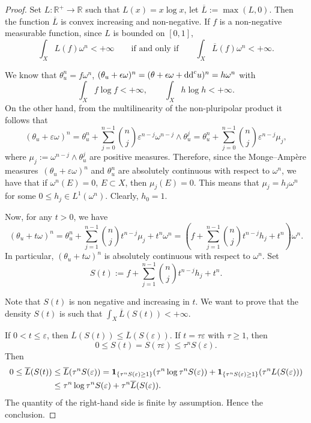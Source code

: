 \documentclass[pdftex]{sigma}
\numberwithin{equation}{section}
\theoremstyle{plain}
\newcommand{\R}{\mathbb R}
\begin{document}
\begin{proof}
Set $L\colon \R^+\rightarrow \R$ such that $L(x)= x \log x$, let $\overline{L}:=\max(L,0)$. Then the function $\overline{L}$ is convex increasing and non-negative. If $f$ is a non-negative measurable function, since $L$ is bounded on $[0,1]$,
\[\int_X L(f) \omega^n < +\infty \qquad \text{if and only if}\qquad \int_X \overline{L}(f) \omega^n < +\infty. \]

We know that $\theta_u^n = f \omega^n$, $(\theta_u+\epsilon\omega)^n=(\theta+\epsilon\omega +{\rm dd}^c u)^n = h \omega^n$ with
\[\int_X f \log f< +\infty, \qquad \int_X h\log h< +\infty.\]
On the other hand, from the multilinearity of the non-pluripolar product it follows that
\[(\theta_u+\varepsilon\omega)^n =\theta_u^n + \sum_{j=0}^{n-1} \binom{n}{j} \varepsilon^{n-j} \omega^{n-j} \wedge \theta_u^j=\theta_u^n + \sum_{j=0}^{n-1} \binom{n}{j} \varepsilon^{n-j}\mu_j,\]
where $\mu_j:=\omega^{n-j}\wedge \theta_u^j$ are positive measures. Therefore, since the Monge--Amp\`ere measures~${(\theta_u\!+\varepsilon\omega)^n}$ and $\theta_u^n$ are absolutely continuous with respect to $\omega^n$, we have that if ${\omega^n(E)=0}$, $E\subset X$, then $\mu_j(E)=0$. This means that $\mu_j = h_j \omega^n$ for some $0\leq h_j\in L^1(\omega^n)$. Clearly, $h_0=1$.

Now, for any $t>0$, we have
\begin{equation*}
 (\theta_u+t\omega)^n= \theta_u^n+ \sum_{j=1}^{n-1} \binom{n}{j} t^{n-j}\mu_j+t^n \omega^n=\left( f +\sum_{j=1}^{n-1} \binom{n}{j} t^{n-j} h_j +t^n\right) \omega^n.
\end{equation*}
In particular, $(\theta_u+t \omega)^n$ is absolutely continuous with respect to $\omega^n$. Set
 \[S(t):=f+\sum_{j=1}^{n-1} \binom{n}{j} t^{n-j} h_j +t^n.\]

Note that $S(t)$ is non negative and increasing in $t$.
 We want to prove that the density $S(t)$ is such that $\int_X \overline{L}(S(t)) < +\infty $.

If $0 < t \leq \varepsilon$, then $\overline{L}(S(t)) \leq \overline{L}(S(\varepsilon))$. If $t = \tau \varepsilon$ with $\tau \geq 1$, then
\[
0\leq S(t)= S(\tau \varepsilon) \leq \tau^n S(\varepsilon).\]
Then
\begin{align*}
0 \leq \overline{L}(S(t)) &\leq \overline{L}(\tau^n S(\varepsilon)) ={\bf 1}_{\{\tau^n S(\varepsilon) \geq 1\}}( \tau^n \log \tau^n S(\varepsilon) ) + {\bf 1}_{\{\tau^n S(\varepsilon) \geq 1\}} ( \tau^n L (S(\varepsilon))) \\
&\leq \tau^n \log \tau^n S(\varepsilon) + \tau^n \overline{L}(S(\varepsilon)).
 \end{align*}
The quantity of the right-hand side is finite by assumption. Hence the conclusion.
 \end{proof}
\end{document}
